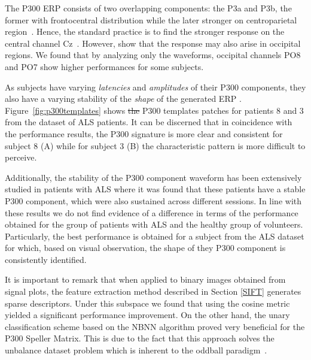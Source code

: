 \documentclass[utf8]{frontiersSCNS} %
\providecommand{\DIFaddtex}[1]{{\protect\color{blue}\uwave{#1}}} %
\providecommand{\DIFdeltex}[1]{{\protect\color{red}\sout{#1}}}                      %
\providecommand{\DIFaddbegin}{} %
\providecommand{\DIFaddend}{} %
\providecommand{\DIFdelbegin}{} %
\providecommand{\DIFdelend}{} %
\providecommand{\DIFadd}[1]{\texorpdfstring{\DIFaddtex{#1}}{#1}} %
\providecommand{\DIFdel}[1]{\texorpdfstring{\DIFdeltex{#1}}{}} %
\begin{document}
The P300 ERP  consists of two overlapping components: the P3a and P3b, the former with frontocentral distribution while the later stronger on centroparietal region~\citep{Polich2007}. Hence, the standard practice is to find the stronger response on the central channel Cz~\citep{Riccio2013}. However, \cite{Krusienski2006} show that the response may also arise in occipital regions.  We found that by analyzing only the waveforms, occipital channels PO8 and PO7 show higher performances for some subjects. 


As subjects have varying \textit{latencies} and \textit{amplitudes} of their P300 components, they also have a varying stability of the \textit{shape} of the generated ERP \citep{Nam2010}.  Figure~\ref{fig:p300templates} shows \DIFdelbegin \DIFdel{the }\DIFdelend \DIFaddbegin \DIFadd{10 sample }\DIFaddend P300 templates patches for patients 8 and 3 from the dataset of ALS patients. It can be discerned that in coincidence with the performance results, the P300 signature is more clear and consistent for subject 8 (A) while for subject 3 (B) the characteristic pattern is more difficult to perceive.

Additionally, the stability of the P300 component waveform has been extensively studied in patients with ALS \citep{SellersandEmanuelDonchin2006,TomohiroMadarame2008,Nijboer2009,Mak2012,McCane2015} where it was found that these patients have a stable P300 component, which were also sustained across different sessions.  In line with these results we do not find evidence of a difference in terms of the performance obtained for the group of patients with ALS and the healthy group of volunteers. Particularly, the best performance is obtained for a subject from the ALS dataset for which, based on visual observation, the shape of they P300 component is consistently identified.


It is important to remark that when applied to binary images obtained from signal plots, the feature extraction method described in Section \ref{SIFT} generates sparse descriptors.  Under this subspace we found that using the cosine metric yielded a significant performance improvement. On the other hand, the unary classification scheme based on the NBNN algorithm proved very beneficial for the P300 Speller Matrix.  This is due to the fact that this approach solves the unbalance dataset problem which is inherent to the oddball paradigm~\citep{Tibon2015}.  
\end{document}
